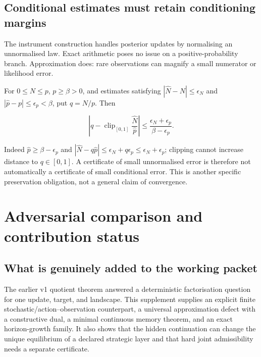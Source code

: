 \documentclass[11pt,a4paper]{article}
\begin{document}
\subsection{Conditional estimates must retain conditioning
margins}\label{conditional-estimates-must-retain-conditioning-margins}

The instrument construction handles posterior updates by normalising an
unnormalised law. Exact arithmetic poses no issue on a
positive-probability branch. Approximation does: rare observations can
magnify a small numerator or likelihood error.

For \(0\le N\le p\), \(p\ge\beta>0\), and estimates satisfying
\(|\widehat N-N|\le\epsilon_N\) and
\(|\widehat p-p|\le\epsilon_p<\beta\), put \(q=N/p\). Then

\nopagebreak[4]

\[
\left|q-\operatorname{clip}_{[0,1]}\frac{\widehat N}{\widehat p}\right|
 \le\frac{\epsilon_N+\epsilon_p}{\beta-\epsilon_p}.
\]

Indeed \(\widehat p\ge\beta-\epsilon_p\) and
\(|\widehat N-q\widehat p|\le\epsilon_N+q\epsilon_p\le\epsilon_N+\epsilon_p\);
clipping cannot increase distance to \(q\in[0,1]\). A certificate of
small unnormalised error is therefore not automatically a certificate of
small conditional error. This is another specific preservation
obligation, not a general claim of convergence.

\section{Adversarial comparison and contribution
status}\label{adversarial-comparison-and-contribution-status}

\subsection{What is genuinely added to the working
packet}\label{what-is-genuinely-added-to-the-working-packet}

The earlier v1 quotient theorem answered a deterministic factorisation
question for one update, target, and landscape. This supplement supplies
an explicit finite stochastic/action--observation counterpart, a
universal approximation defect with a constructive dual, a minimal
continuous memory theorem, and an exact horizon-growth family. It also
shows that the hidden continuation can change the unique equilibrium of
a declared strategic layer and that hard joint admissibility needs a
separate certificate.
\end{document}

